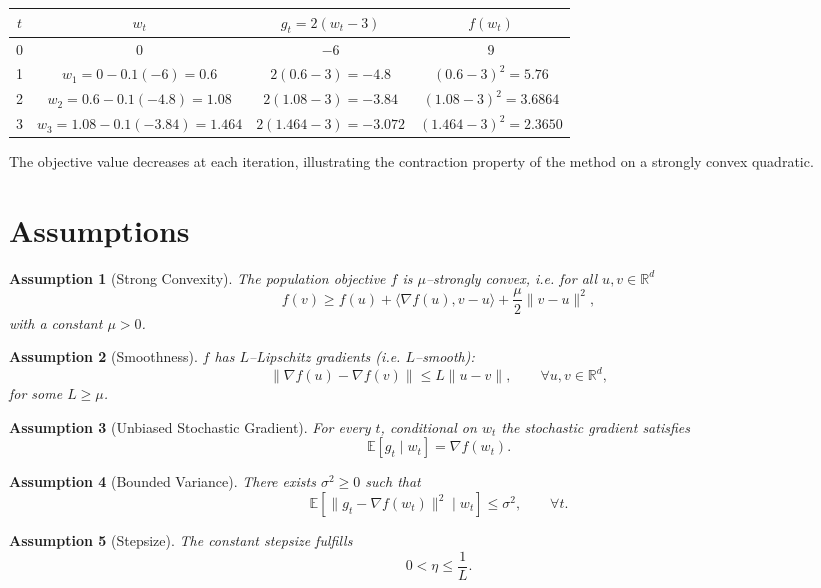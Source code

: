 \documentclass[11pt]{article}
\newtheorem{assumption}{Assumption}
\newcommand{\E}{\mathbb{E}}
\newcommand{\R}{\mathbb{R}}
\begin{document}
\begin{center}
\begin{tabular}{c|c|c|c}
$t$ & $w_{t}$ & $g_{t}=2(w_{t}-3)$ & $f(w_{t})$\\ \hline
0 & $0$ & $-6$ & $9$\\
1 & $w_{1}=0-0.1(-6)=0.6$ & $2(0.6-3)=-4.8$ & $(0.6-3)^{2}=5.76$\\
2 & $w_{2}=0.6-0.1(-4.8)=1.08$ & $2(1.08-3)=-3.84$ & $(1.08-3)^{2}=3.6864$\\
3 & $w_{3}=1.08-0.1(-3.84)=1.464$ & $2(1.464-3)=-3.072$ & $(1.464-3)^{2}=2.3650$
\end{tabular}
\end{center}
The objective value decreases at each iteration, illustrating the contraction property of the method on a strongly convex quadratic.

\newpage
\section*{Assumptions}
\begin{assumption}[Strong Convexity]\label{ass:strong}
The population objective $f$ is $\mu$–strongly convex, i.e. for all $u,v\in\R^{d}$
\[
f(v)\ge f(u)+\langle\nabla f(u),v-u\rangle+\frac{\mu}{2}\|v-u\|^{2},
\]
with a constant $\mu>0$.
\end{assumption}

\begin{assumption}[Smoothness]\label{ass:smooth}
$f$ has $L$–Lipschitz gradients (i.e. $L$–smooth):
\[
\|\nabla f(u)-\nabla f(v)\|\le L\|u-v\|,\qquad\forall u,v\in\R^{d},
\]
for some $L\ge\mu$.
\end{assumption}

\begin{assumption}[Unbiased Stochastic Gradient]\label{ass:unbiased}
For every $t$, conditional on $w_{t}$ the stochastic gradient satisfies
\[
\E\!\left[g_{t}\mid w_{t}\right]=\nabla f(w_{t}).
\]
\end{assumption}

\begin{assumption}[Bounded Variance]\label{ass:variance}
There exists $\sigma^{2}\ge0$ such that
\[
\E\!\left[\|g_{t}-\nabla f(w_{t})\|^{2}\mid w_{t}\right]\le\sigma^{2},
\qquad\forall t.
\]
\end{assumption}

\begin{assumption}[Stepsize]\label{ass:stepsize}
The constant stepsize fulfills
\[
0<\eta\le\frac{1}{L}.
\tag{A5}
\]
\end{assumption}
\end{document}
